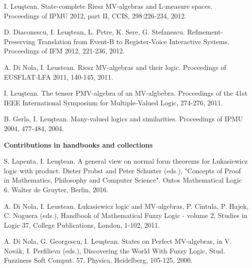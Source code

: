 \documentclass[11pt]{article}
\begin{document}
\noindent
[P5] I. Leu\c stean. State-complete Riesz MV-algebras and L-measure spaces. Proceedings of IPMU 2012, part II, CCIS, 298:226-234, 2012.

\noindent
[P4] D. Diaconescu, I. Leu\c stean, L. Petre, K. Sere, G. Stefanescu. Refinement-Preserving Translation from Event-B to Register-Voice Interactive Systems. Proceedings of IFM 2012, 221-236, 2012.

\noindent
[P3]  A. Di Nola, I. Leustean.  Riesz MV-algebras and their logic. Proceedings of EUSFLAT-LFA 2011, 140-145, 2011.

\noindent
[P2] I. Leu\c stean. The tensor PMV-algebra of an MV-algbebra. Proceedings of the 41st IEEE International Symposium for Multiple-Valued Logic, 274-276, 2011.

\noindent
[P1] B. Gerla, I. Leu\c stean. Many-valued logics and similarities. Proceedings of IPMU 2004, 477-484, 2004.

\vspace{0.3cm}
\noindent
{\large \textbf{Contributions in handbooks and collections}}

\noindent
[C2]
S. Lapenta,  I. Leu\c stean. A general view on normal form theorems for Lukasiewicz logic with product.
      Dieter Probst and Peter Schuster (eds.), "Concepts of Proof in Mathematics, Philosophy and
      Computer Science". Ontos Mathematical Logic 6. Walter de Gruyter, Berlin, 2016. 


\noindent
[H1] A. Di Nola, I. Leustean. \L ukasiewicz logic and MV-algebras,
P. Cintula, P. Hajek, C. Noguera (eds.), Handbook of Mathematical Fuzzy Logic - volume 2,
    Studies in Logic 37, College Publications, London, 1-102,  2011.

\noindent
[C1] A. Di Nola, G. Georgescu, I. Leu\c stean. States on Perfect MV-algebras, in V. Nov\' ak, I. Perfilieva (eds.), Discovering the World With Fuzzy Logic, Stud. Fuzziness Soft Comput. 57, Physica, Heidelberg, 105-125, 2000.
\end{document}
